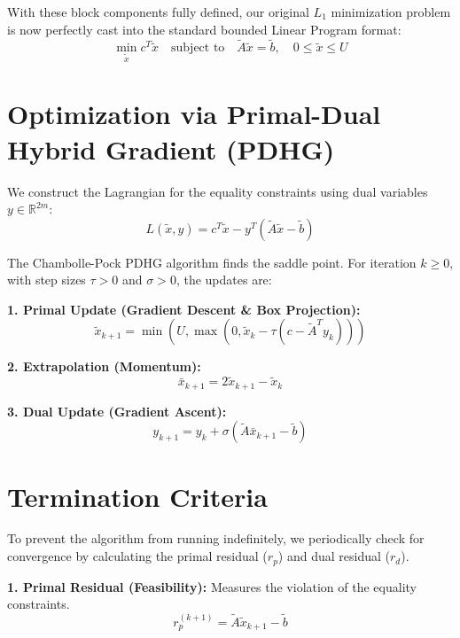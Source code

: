 \documentclass{article}
\begin{document}
With these block components fully defined, our original $L_1$ minimization problem is now perfectly cast into the standard bounded Linear Program format:
\begin{equation}
    \min_{\tilde{x}} c^T \tilde{x} \quad \text{subject to} \quad \tilde{A}\tilde{x} = \tilde{b}, \quad 0 \le \tilde{x} \le U
\end{equation}

\section{Optimization via Primal-Dual Hybrid Gradient (PDHG)}
We construct the Lagrangian for the equality constraints using dual variables $y \in \mathbb{R}^{2m}$:
\begin{equation}
    L(\tilde{x}, y) = c^T \tilde{x} - y^T(\tilde{A}\tilde{x} - \tilde{b})
\end{equation}

The Chambolle-Pock PDHG algorithm finds the saddle point. For iteration $k \ge 0$, with step sizes $\tau > 0$ and $\sigma > 0$, the updates are:

\textbf{1. Primal Update (Gradient Descent \& Box Projection):}
\begin{equation}
    \tilde{x}_{k+1} = \min\left(U, \max\left(0, \tilde{x}_k - \tau (c - \tilde{A}^T y_k)\right)\right)
\end{equation}

\textbf{2. Extrapolation (Momentum):}
\begin{equation}
    \bar{x}_{k+1} = 2\tilde{x}_{k+1} - \tilde{x}_k
\end{equation}

\textbf{3. Dual Update (Gradient Ascent):}
\begin{equation}
    y_{k+1} = y_k + \sigma (\tilde{A}\bar{x}_{k+1} - \tilde{b})
\end{equation}

\section{Termination Criteria}
To prevent the algorithm from running indefinitely, we periodically check for convergence by calculating the primal residual ($r_p$) and dual residual ($r_d$). 

\textbf{1. Primal Residual (Feasibility):} Measures the violation of the equality constraints.
\begin{equation}
    r_p^{(k+1)} = \tilde{A}\tilde{x}_{k+1} - \tilde{b}
\end{equation}
\end{document}
